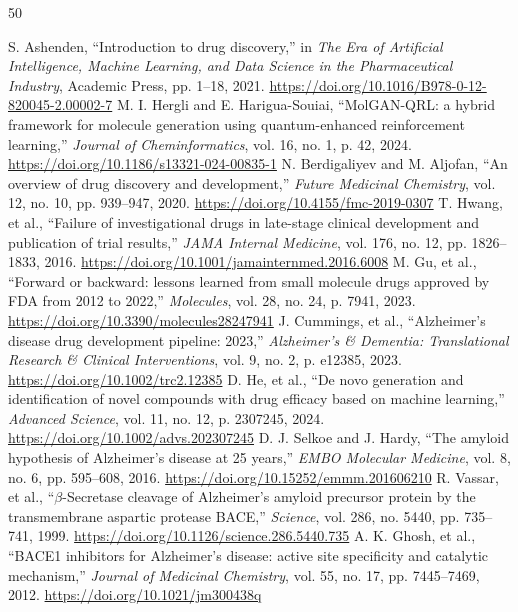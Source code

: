 \documentclass[10pt,a4paper]{article}
\begin{document}
\begin{thebibliography}{50}
\small
\setlength{\itemsep}{0.5pt}
\setlength{\parskip}{0pt}

 S. Ashenden, ``Introduction to drug discovery,'' in \textit{The Era of Artificial Intelligence, Machine Learning, and Data Science in the Pharmaceutical Industry}, Academic Press, pp. 1--18, 2021. \url{https://doi.org/10.1016/B978-0-12-820045-2.00002-7}
 M. I. Hergli and E. Harigua-Souiai, ``MolGAN-QRL: a hybrid framework for molecule generation using quantum-enhanced reinforcement learning,'' \textit{Journal of Cheminformatics}, vol. 16, no. 1, p. 42, 2024. \url{https://doi.org/10.1186/s13321-024-00835-1}
 N. Berdigaliyev and M. Aljofan, ``An overview of drug discovery and development,'' \textit{Future Medicinal Chemistry}, vol. 12, no. 10, pp. 939--947, 2020. \url{https://doi.org/10.4155/fmc-2019-0307}
 T. Hwang, et al., ``Failure of investigational drugs in late-stage clinical development and publication of trial results,'' \textit{JAMA Internal Medicine}, vol. 176, no. 12, pp. 1826--1833, 2016. \url{https://doi.org/10.1001/jamainternmed.2016.6008}
 M. Gu, et al., ``Forward or backward: lessons learned from small molecule drugs approved by FDA from 2012 to 2022,'' \textit{Molecules}, vol. 28, no. 24, p. 7941, 2023. \url{https://doi.org/10.3390/molecules28247941}
 J. Cummings, et al., ``Alzheimer's disease drug development pipeline: 2023,'' \textit{Alzheimer's \& Dementia: Translational Research \& Clinical Interventions}, vol. 9, no. 2, p. e12385, 2023. \url{https://doi.org/10.1002/trc2.12385}
 D. He, et al., ``De novo generation and identification of novel compounds with drug efficacy based on machine learning,'' \textit{Advanced Science}, vol. 11, no. 12, p. 2307245, 2024. \url{https://doi.org/10.1002/advs.202307245}
 D. J. Selkoe and J. Hardy, ``The amyloid hypothesis of Alzheimer's disease at 25 years,'' \textit{EMBO Molecular Medicine}, vol. 8, no. 6, pp. 595--608, 2016. \url{https://doi.org/10.15252/emmm.201606210}
 R. Vassar, et al., ``$\beta$-Secretase cleavage of Alzheimer's amyloid precursor protein by the transmembrane aspartic protease BACE,'' \textit{Science}, vol. 286, no. 5440, pp. 735--741, 1999. \url{https://doi.org/10.1126/science.286.5440.735}
 A. K. Ghosh, et al., ``BACE1 inhibitors for Alzheimer's disease: active site specificity and catalytic mechanism,'' \textit{Journal of Medicinal Chemistry}, vol. 55, no. 17, pp. 7445--7469, 2012. \url{https://doi.org/10.1021/jm300438q}

\end{thebibliography}
\end{document}

